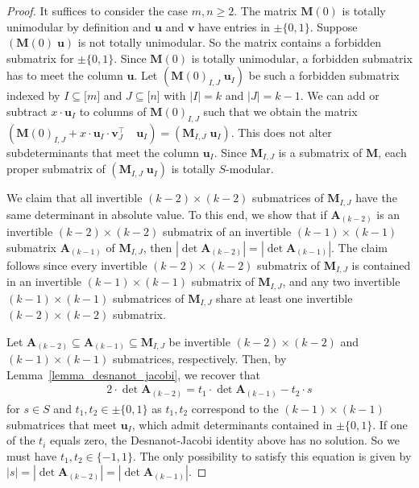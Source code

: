 \documentclass[a4paper, 11pt]{article}
\newcommand{\bA}{\bm{A}}
\newcommand{\bv}{\bm{v}}
\newcommand{\bu}{\bm{u}}
\newcommand{\bM}{\bm{M}}
\newcommand{\indet}{x}
\newcommand{\polyS}{S}
\newcommand{\polyM}{\bM}
\begin{document}
	\begin{proof}
		It suffices to consider the case $m,n\geq 2$. The matrix $\bM(0)$ is totally unimodular by definition and $\bu$ and $\bv$ have entries in $\pm\lbrace 0,1\rbrace$. 
		Suppose $(\bM(0) \; \bu)$ is not totally unimodular. So the matrix contains a forbidden submatrix for $\pm\lbrace 0,1\rbrace$. Since $\bM(0)$ is totally unimodular, a forbidden submatrix has to meet the column $\bu$. Let $(\bM(0)_{I,J} \; \bu_I)$ be such a forbidden submatrix indexed by $I\subseteq \lbrack m\rbrack$ and $J\subseteq \lbrack n\rbrack$ with $|I|=k$ and $|J|=k-1$. We can add or subtract $\indet\cdot\bu_I$ to columns of $\bM(0)_{I,J}$ such that we obtain the matrix $(\bM(0)_{I,J}+ \indet\cdot\bu_I\cdot\bv_J^\top \quad \bu_I) = (\polyM_{I,J} \; \bu_I)$. This does not alter subdeterminants that meet the column $\bu_I$. 
		Since $\polyM_{I,J}$ is a submatrix of $\polyM$, each proper submatrix of $(\polyM_{I,J}\; \bu_I)$ is totally $\polyS$-modular. 
		
		We claim that all invertible $(k-2)\times (k-2)$ submatrices of $\polyM_{I,J}$ have the same determinant in absolute value. To this end, we show that if $\bA_{(k-2)}$ is an invertible $(k-2)\times(k-2)$ submatrix of an invertible $(k-1)\times(k-1)$ submatrix $\bA_{(k-1)}$ of $\bM_{I,J}$, then $|\det\bA_{(k-2)}	|=|\det\bA_{(k-1)}|$. The claim follows since every invertible $(k-2)\times(k-2)$ submatrix of $\polyM_{I,J}$ is contained in an invertible $(k-1)\times(k-1)$ submatrix of $\polyM_{I,J}$, and any two invertible $(k-1)\times(k-1)$ submatrices of $\polyM_{I,J}$ share at least one invertible $(k-2)\times(k-2)$ submatrix.
			
		Let $\bA_{(k-2)}\subseteq \bA_{(k-1)}\subseteq \polyM_{I,J}$ be invertible $(k-2)\times (k-2)$ and $(k-1)\times (k-1)$ submatrices, respectively. Then, by Lemma~\ref{lemma_desnanot_jacobi}, we recover that 
		\begin{align*}
			2\cdot\det\bA_{(k-2)} = t_1\cdot\det\bA_{(k-1)} - t_2\cdot s
		\end{align*}
		for $s\in \polyS$ and $t_1,t_2\in \pm \lbrace 0,1\rbrace$ as $t_1,t_2$ correspond to the $(k-1)\times (k-1)$ submatrices that meet $\bu_I$, which admit determinants contained in $\pm \lbrace 0,1\rbrace$. If one of the $t_i$ equals zero, the Desnanot-Jacobi identity above has no solution. So we must have $t_1,t_2\in\{-1,1\}$. The only possibility to satisfy this equation is given by $\left|s\right| = \left|\det\bA_{(k-2)}\right| = \left|\det\bA_{(k-1)}\right|$.
		

\end{proof}
\end{document}
